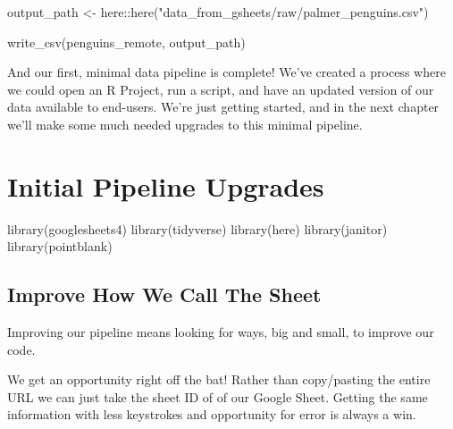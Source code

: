\documentclass[
  letterpaper,
  DIV=11,
  numbers=noendperiod]{scrreprt}
\newenvironment{Shaded}{\begin{snugshade}}{\end{snugshade}}
\newcommand{\FunctionTok}[1]{\textcolor[rgb]{0.28,0.35,0.67}{#1}}
\newcommand{\NormalTok}[1]{\textcolor[rgb]{0.00,0.23,0.31}{#1}}
\newcommand{\OtherTok}[1]{\textcolor[rgb]{0.00,0.23,0.31}{#1}}
\newcommand{\SpecialCharTok}[1]{\textcolor[rgb]{0.37,0.37,0.37}{#1}}
\newcommand{\StringTok}[1]{\textcolor[rgb]{0.13,0.47,0.30}{#1}}
\begin{document}
\begin{Shaded}
\begin{Highlighting}[]
\NormalTok{output\_path }\OtherTok{\textless{}{-}}\NormalTok{ here}\SpecialCharTok{::}\FunctionTok{here}\NormalTok{(}\StringTok{"data\_from\_gsheets/raw/palmer\_penguins.csv"}\NormalTok{)}

\FunctionTok{write\_csv}\NormalTok{(penguins\_remote, output\_path)}
\end{Highlighting}
\end{Shaded}

And our first, minimal data pipeline is complete! We've created a
process where we could open an R Project, run a script, and have an
updated version of our data available to end-users. We're just getting
started, and in the next chapter we'll make some much needed upgrades to
this minimal pipeline.


\hypertarget{initial-pipeline-upgrades}{%
\chapter{Initial Pipeline Upgrades}\label{initial-pipeline-upgrades}}

\begin{Shaded}
\begin{Highlighting}[]
\FunctionTok{library}\NormalTok{(googlesheets4)}
\FunctionTok{library}\NormalTok{(tidyverse)}
\FunctionTok{library}\NormalTok{(here)}
\FunctionTok{library}\NormalTok{(janitor)}
\FunctionTok{library}\NormalTok{(pointblank)}
\end{Highlighting}
\end{Shaded}

\hypertarget{improve-how-we-call-the-sheet}{%
\section{Improve How We Call The
Sheet}\label{improve-how-we-call-the-sheet}}

Improving our pipeline means looking for ways, big and small, to improve
our code.

We get an opportunity right off the bat! Rather than copy/pasting the
entire URL we can just take the sheet ID of of our Google Sheet. Getting
the same information with less keystrokes and opportunity for error is
always a win.
\end{document}
